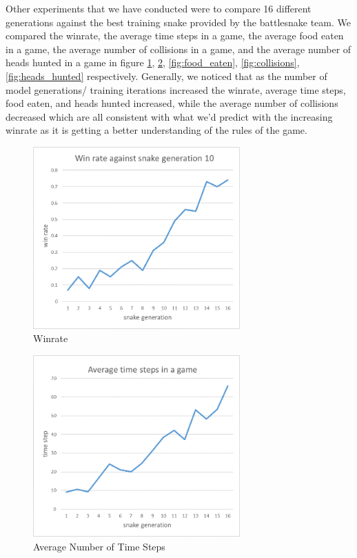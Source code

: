 \documentclass{article}
\begin{document}
Other experiments that we have conducted were to compare 16 different
generations against the best training snake provided by the battlesnake team. We
compared the winrate, the average time steps in a game, the average food eaten
in a game, the average number of collisions in a game, and the average number of
heads hunted in a game in figure \ref{fig:winrate}, \ref{fig:time_steps},
\ref{fig:food_eaten}, \ref{fig:collisions}, \ref{fig:heads_hunted} respectively.
Generally, we noticed that as the number of model generations/ training
iterations increased the winrate, average time steps, food eaten, and heads
hunted increased, while the average number of collisions decreased which are all
consistent with what we'd predict with the increasing winrate as it is getting a
better understanding of the rules of the game.

\begin{figure}[!ht]
  \centering
  \includegraphics[width=300px]{winrate}
  \caption{Winrate}
  \label{fig:winrate}
\end{figure}
\FloatBarrier

\begin{figure}[!ht]
  \centering
  \includegraphics[width=300px]{time_steps}
  \caption{Average Number of Time Steps}
  \label{fig:time_steps}
\end{figure}
\FloatBarrier
\end{document}

